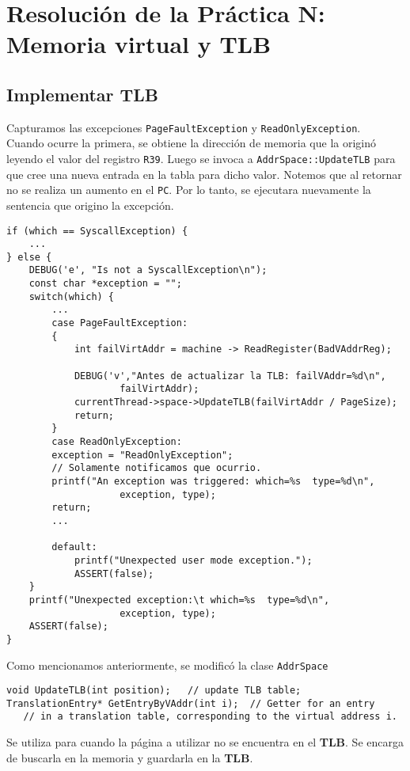 \chapter{Resolución de la Práctica N: Memoria virtual y TLB}
\section{Implementar TLB} \label{update_TLB}
Capturamos las excepciones \texttt{PageFaultException} y \texttt{ReadOnlyException}.\\
Cuando ocurre la primera, se obtiene la dirección de memoria que la originó leyendo el valor del registro \texttt{R39}. Luego se invoca a \texttt{AddrSpace::UpdateTLB} para que cree una nueva entrada en la tabla para dicho valor. Notemos que al retornar no se realiza un aumento en el \texttt{PC}. Por lo tanto, se ejecutara nuevamente la sentencia que origino la excepción.
\begin{lstlisting}[style=C]
if (which == SyscallException) {
	...
} else {
	DEBUG('e', "Is not a SyscallException\n");
    const char *exception = "";
    switch(which) {
    	...
        case PageFaultException:
        {
            int failVirtAddr = machine -> ReadRegister(BadVAddrReg);

            DEBUG('v',"Antes de actualizar la TLB: failVAddr=%d\n",
                    failVirtAddr);
            currentThread->space->UpdateTLB(failVirtAddr / PageSize);
            return;
        }
        case ReadOnlyException: 
        exception = "ReadOnlyException";
        // Solamente notificamos que ocurrio.
        printf("An exception was triggered: which=%s  type=%d\n",
                    exception, type);
        return;    
        ...
        
    	default:
            printf("Unexpected user mode exception.");
            ASSERT(false);
    }
    printf("Unexpected exception:\t which=%s  type=%d\n",
                    exception, type);
    ASSERT(false);
}
\end{lstlisting}
Como mencionamos anteriormente, se modificó la clase \texttt{AddrSpace}
\begin{lstlisting}[style=C]
void UpdateTLB(int position);   // update TLB table;
TranslationEntry* GetEntryByVAddr(int i);  // Getter for an entry 
   // in a translation table, corresponding to the virtual address i.
\end{lstlisting}
Se utiliza para cuando la página a utilizar no se encuentra en el \textbf{TLB}. Se encarga de buscarla en la memoria y guardarla en la \textbf{TLB}.
